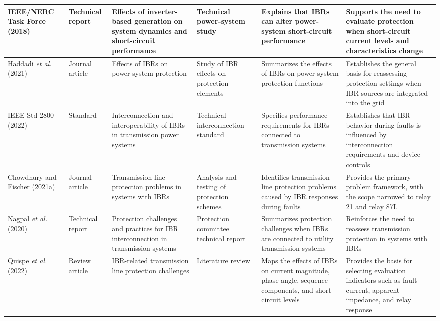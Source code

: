 \begin{longtable}{|p{}|p{}|p{}|p{}|p{}|p{}|}
    IEEE/NERC Task Force (2018) \cite{ieeenerc2018tr68} & Technical report & Effects of inverter-based generation on system dynamics and short-circuit performance & Technical power-system study & Explains that IBRs can alter power-system short-circuit performance & Supports the need to evaluate protection when short-circuit current levels and characteristics change \\ \hline

    Haddadi \textit{et al.} (2021) \cite{haddadi2021systemprotection} & Journal article & Effects of IBRs on power-system protection & Study of IBR effects on protection elements & Summarizes the effects of IBRs on power-system protection functions & Establishes the general basis for reassessing protection settings when IBR sources are integrated into the grid \\ \hline

    IEEE Std 2800 (2022) \cite{ieee2022std2800} & Standard & Interconnection and interoperability of IBRs in transmission power systems & Technical interconnection standard & Specifies performance requirements for IBRs connected to transmission systems & Establishes that IBR behavior during faults is influenced by interconnection requirements and device controls \\ \hline

    Chowdhury and Fischer (2021a) \cite{chowdhury2021tlp1} & Journal article & Transmission line protection problems in systems with IBRs & Analysis and testing of protection schemes & Identifies transmission line protection problems caused by IBR responses during faults & Provides the primary problem framework, with the scope narrowed to relay 21 and relay 87L \\ \hline

    Nagpal \textit{et al.} (2020) \cite{nagpal2020tr81} & Technical report & Protection challenges and practices for IBR interconnection in transmission systems & Protection committee technical report & Summarizes protection challenges when IBRs are connected to utility transmission systems & Reinforces the need to reassess transmission protection in systems with IBRs \\ \hline

    Quispe \textit{et al.} (2022) \cite{quispe2022transmission_review} & Review article & IBR-related transmission line protection challenges & Literature review & Maps the effects of IBRs on current magnitude, phase angle, sequence components, and short-circuit levels & Provides the basis for selecting evaluation indicators such as fault current, apparent impedance, and relay response \\ \hline


\end{longtable}
